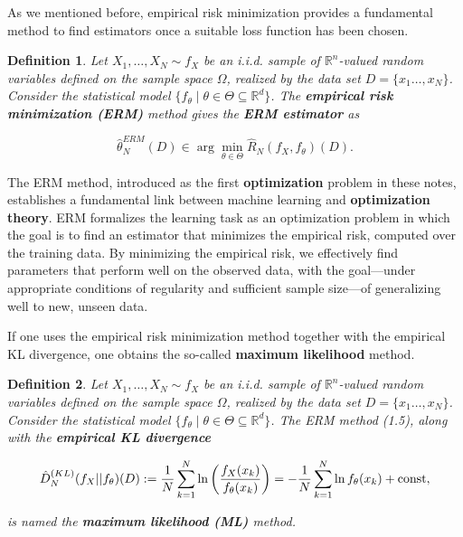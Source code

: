 \documentclass{report}
\newtheorem{definition}{Definition}[chapter]
\begin{document}
As we mentioned before, empirical risk minimization provides a fundamental method to find estimators once a suitable loss function has been chosen.

\begin{definition}
Let $X_1,\dots,X_N \sim f_X$ be an i.i.d. sample of $\mathbb{R}^n$-valued random variables defined on the sample space $\Omega$, realized by the data set $D = \{x_1\dots,x_N\}$. Consider the statistical model $\{f_\theta \mid \theta \in \Theta \subseteq \mathbb{R}^d\}$. The \textbf{empirical risk minimization (ERM)} method gives the \textbf{ERM estimator} as

\begin{equation}
\hat{\theta}^{ERM}_N(D) \in \arg\min_{\theta \in \Theta}\hat{R}_N(f_X,f_\theta)(D).
\end{equation}
\end{definition}

The ERM method, introduced as the first \textbf{optimization} problem in these notes, establishes a fundamental link between machine learning and \textbf{optimization theory}. ERM formalizes the learning task as an optimization problem in which the goal is to find an estimator that minimizes the empirical risk, computed over the training data. By minimizing the empirical risk, we effectively find parameters that perform well on the observed data, with the goal—under appropriate conditions of regularity and sufficient sample size—of generalizing well to new, unseen data.

If one uses the empirical risk minimization method together with the empirical KL divergence, one obtains the so-called \textbf{maximum likelihood} method.

\begin{definition}
Let $X_1,\dots,X_N \sim f_X$ be an i.i.d. sample of $\mathbb{R}^n$-valued random variables defined on the sample space $\Omega$, realized by the data set $D=\{x_1\dots,x_N\}$. Consider the statistical model $\{f_\theta \mid \theta \in \Theta \subseteq \mathbb{R}^d\}$. The ERM method (1.5), along with the \textbf{empirical KL divergence}

\begin{equation}
\hat{D}^{(KL)}_N(f_X||f_\theta)(D) := \frac{1}{N} \sum_{k=1}^{N} \ln \left(\frac{f_X(x_k)}{f_\theta(x_k)}\right) = -\frac{1}{N} \sum_{k=1}^{N} \ln  f_\theta(x_k) + \textup{const},
\end{equation}

is named the \textbf{maximum likelihood (ML)} method.
\end{definition}
\end{document}
